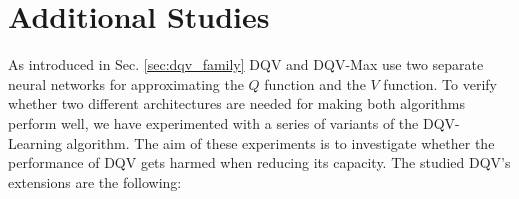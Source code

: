 


\section{Additional Studies}
As introduced in Sec. \ref{sec:dqv_family} DQV and DQV-Max use two separate neural networks for approximating the $Q$ function and the $V$ function. To verify whether two different architectures are needed for making both algorithms perform well, we have experimented with a series of variants of the DQV-Learning algorithm. The aim of these experiments is to investigate whether the performance of DQV gets harmed when reducing its capacity.
The studied DQV's extensions are the following:

